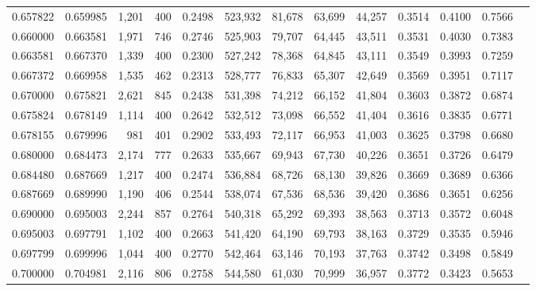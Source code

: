 \begin{tabular}{rrrrrrrrrrrrr}
0.657822 & 0.659985 &  1,201 &   400 &                                     0.2498 & 523,932 &  81,678 &  63,699 &  44,257 & 0.3514 & 0.4100 & 0.7566 \\
0.660000 & 0.663581 &  1,971 &   746 &                                     0.2746 & 525,903 &  79,707 &  64,445 &  43,511 & 0.3531 & 0.4030 & 0.7383 \\
0.663581 & 0.667370 &  1,339 &   400 &                                     0.2300 & 527,242 &  78,368 &  64,845 &  43,111 & 0.3549 & 0.3993 & 0.7259 \\
0.667372 & 0.669958 &  1,535 &   462 &                                     0.2313 & 528,777 &  76,833 &  65,307 &  42,649 & 0.3569 & 0.3951 & 0.7117 \\
0.670000 & 0.675821 &  2,621 &   845 &                                     0.2438 & 531,398 &  74,212 &  66,152 &  41,804 & 0.3603 & 0.3872 & 0.6874 \\
0.675824 & 0.678149 &  1,114 &   400 &                                     0.2642 & 532,512 &  73,098 &  66,552 &  41,404 & 0.3616 & 0.3835 & 0.6771 \\
0.678155 & 0.679996 &    981 &   401 &                                     0.2902 & 533,493 &  72,117 &  66,953 &  41,003 & 0.3625 & 0.3798 & 0.6680 \\
0.680000 & 0.684473 &  2,174 &   777 &                                     0.2633 & 535,667 &  69,943 &  67,730 &  40,226 & 0.3651 & 0.3726 & 0.6479 \\
0.684480 & 0.687669 &  1,217 &   400 &                                     0.2474 & 536,884 &  68,726 &  68,130 &  39,826 & 0.3669 & 0.3689 & 0.6366 \\
0.687669 & 0.689990 &  1,190 &   406 &                                     0.2544 & 538,074 &  67,536 &  68,536 &  39,420 & 0.3686 & 0.3651 & 0.6256 \\
0.690000 & 0.695003 &  2,244 &   857 &                                     0.2764 & 540,318 &  65,292 &  69,393 &  38,563 & 0.3713 & 0.3572 & 0.6048 \\
0.695003 & 0.697791 &  1,102 &   400 &                                     0.2663 & 541,420 &  64,190 &  69,793 &  38,163 & 0.3729 & 0.3535 & 0.5946 \\
0.697799 & 0.699996 &  1,044 &   400 &                                     0.2770 & 542,464 &  63,146 &  70,193 &  37,763 & 0.3742 & 0.3498 & 0.5849 \\
0.700000 & 0.704981 &  2,116 &   806 &                                     0.2758 & 544,580 &  61,030 &  70,999 &  36,957 & 0.3772 & 0.3423 & 0.5653 \\

\end{tabular}
